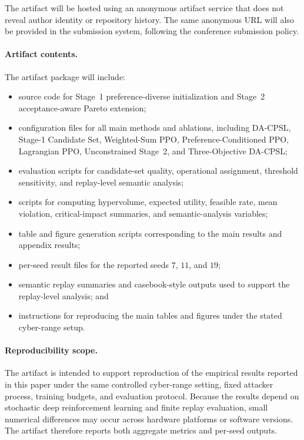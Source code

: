 \documentclass[sigconf,review,anonymous]{acmart}
\begin{document}
The artifact will be hosted using an anonymous artifact service that does
not reveal author identity or repository history. The same anonymous URL
will also be provided in the submission system, following the conference
submission policy.

\paragraph{Artifact contents.}
The artifact package will include:
\begin{itemize}
    \item source code for Stage~1 preference-diverse initialization and
    Stage~2 acceptance-aware Pareto extension;
    \item configuration files for all main methods and ablations, including
    DA-CPSL, Stage-1 Candidate Set, Weighted-Sum PPO,
    Preference-Conditioned PPO, Lagrangian PPO, Unconstrained Stage~2,
    and Three-Objective DA-CPSL;
    \item evaluation scripts for candidate-set quality, operational
    assignment, threshold sensitivity, and replay-level semantic analysis;
    \item scripts for computing hypervolume, expected utility, feasible
    rate, mean violation, critical-impact summaries, and semantic-analysis
    variables;
    \item table and figure generation scripts corresponding to the main
    results and appendix results;
    \item per-seed result files for the reported seeds \(7\), \(11\), and
    \(19\);
    \item semantic replay summaries and casebook-style outputs used to
    support the replay-level analysis; and
    \item instructions for reproducing the main tables and figures under
    the stated cyber-range setup.
\end{itemize}

\paragraph{Reproducibility scope.}
The artifact is intended to support reproduction of the empirical results
reported in this paper under the same controlled cyber-range setting,
fixed attacker process, training budgets, and evaluation protocol.
Because the results depend on stochastic deep reinforcement learning and
finite replay evaluation, small numerical differences may occur across
hardware platforms or software versions. The artifact therefore reports
both aggregate metrics and per-seed outputs.
\end{document}
